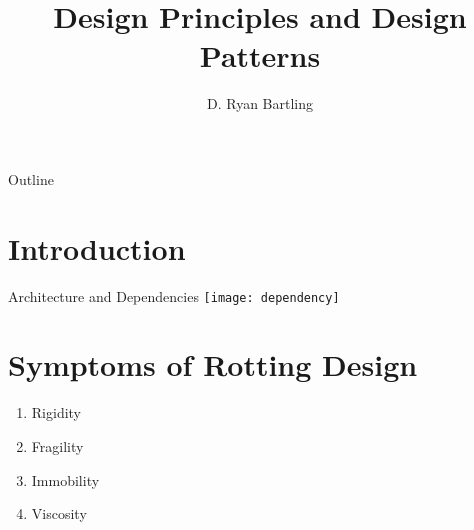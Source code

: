 \documentclass[xcolor=svgnames]{beamer}
\title
    [Design Principles\hspace{2em}]
    {Design Principles and Design Patterns}
\author
    [Ryan Bartling]
    {D. Ryan Bartling}
\begin{document}


\iftrue
\maketitle


\setcounter{tocdepth}{1}
\begin{frame}{Outline}
    \tableofcontents
\end{frame}


\section{Introduction}


\begin{frame}{Architecture and Dependencies}
    \centering
    \texttt{[image: dependency]}
\end{frame}


\section[Rotting Code]{Symptoms of Rotting Design}


\begin{frame}{\secname}
    \begin{enumerate}
        \pause \item Rigidity %
        \pause \item Fragility %
        \pause \item Immobility %
        \pause \item Viscosity %
    \end{enumerate}
\end{frame}
\end{document}

